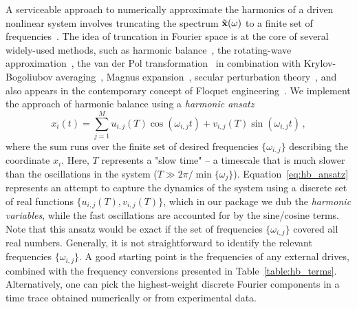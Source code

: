 A serviceable approach to numerically approximate the harmonics of a driven nonlinear system involves truncating the spectrum  $\tilde{\vb{x}}(\omega)$ to a finite set of frequencies~\cite{Guckenheimer_Holmes}. The idea of truncation in Fourier space is at the core of several widely-used methods, such as harmonic balance~\cite{Krack_2019, Luo_2012}, the rotating-wave approximation~\cite{Gardiner2004}, the van der Pol transformation~\cite{Rand_2005} in combination with Krylov-Bogoliubov averaging~\cite{Nayfeh_2008}, Magnus expansion~\cite{Mikami_2016, Eckardt_2015}, secular perturbation theory~\cite{Lifshitz_2008}, and also appears in the contemporary concept of Floquet engineering~\cite{Rudner_2020, Goldman_2014}. We implement the approach of harmonic balance using a \textit{harmonic ansatz}~\cite{Sarrouy_2011, Guskov_2007}
%
\begin{equation} \label{eq:hb_ansatz}
x_i(t) = \sum_{j=1}^M u_{i,j}  (T)  \cos(\omega_{i,j} t)+ v_{i,j} (T) \sin(\omega_{i,j} t) \,,
\end{equation}
%
where the sum runs over the finite set of desired frequencies $\{\omega_{i,j}\}$ describing the coordinate $x_i$. Here, $T$ represents a "slow time" -- a timescale that is much slower than the oscillations in the system ($T\gg 2\pi/\min \{\omega_j\}$).
Equation~\eqref{eq:hb_ansatz} represents an attempt to capture the dynamics of the system using a discrete set of real functions $\{u_{i,j}(T),v_{i,j}(T)\}$, which in our package we dub the \textit{harmonic variables}, while the fast oscillations are accounted for by the sine/cosine terms. Note that this ansatz would be exact if the set of frequencies $\{\omega_{i,j}\}$ covered all real numbers. Generally, it is not straightforward to identify the relevant frequencies $\{\omega_{i,j}\}$. A good starting point is the frequencies of any external drives, combined with the frequency conversions presented in Table~\ref{table:hb_terms}. Alternatively, one can pick the highest-weight discrete Fourier components in a time trace obtained numerically or from experimental data.

